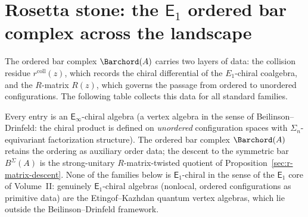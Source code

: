 \section{Rosetta stone: the $\mathsf{E}_1$ ordered bar complex across the landscape}
\label{sec:e1-rosetta-stone}

The ordered bar complex $\Barchord(A)$ carries two layers of data:
the collision residue $r^{\mathrm{coll}}(z)$, which records the
chiral differential of the $E_1$-chiral coalgebra, and
the $R$-matrix $R(z)$, which governs the passage from
ordered to unordered configurations. The following table
collects this data for all standard families.

Every entry is an $\mathsf{E}_\infty$-chiral algebra
(a vertex algebra in the sense of Beilinson--Drinfeld:
the chiral product is defined on \emph{unordered}
configuration spaces with $\Sigma_n$-equivariant
factorization structure). The ordered bar complex
$\Barchord(A)$ retains the ordering as auxiliary order data;
the descent to the symmetric bar $B^\Sigma(A)$ is the
strong-unitary $R$-matrix-twisted quotient of
Proposition~\ref*{sec:r-matrix-descent}.
None of the families below is $\mathsf{E}_1$-chiral in the sense
of the $\mathsf{E}_1$ core of Volume~II\@: genuinely $\mathsf{E}_1$-chiral algebras
(nonlocal, ordered configurations as primitive data) are the
Etingof--Kazhdan quantum vertex algebras, which lie outside
the Beilinson--Drinfeld framework.

